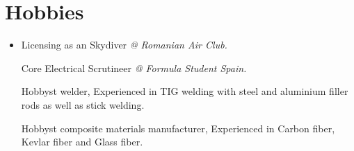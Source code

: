 \documentclass[letterpaper,11pt]{article}
\makeatletter
\newcommand{\resumeOrganizationHeading}[4]{
  \vspace{-2pt}\item
    \begin{tabular*}{0.97\textwidth}[t]{l@{\extracolsep{\fill}}r}
      \textbf{#1} & \textit{\small #2} \\
      \textit{\small#3}
    \end{tabular*}\vspace{-7pt}
}
\newcommand{\resumeSubHeadingListStart}{\begin{itemize}[leftmargin=0.15in, label={}]}
\newcommand{\resumeSubHeadingListEnd}{\end{itemize}}
\makeatother
\begin{document}

\section{Hobbies}
  \resumeSubHeadingListStart

    \item{
        Licensing as an Skydiver \textit{@ Romanian Air Club.}

      Core Electrical Scrutineer \textit{@ Formula Student Spain.}

      Hobbyst welder, Experienced in TIG welding with steel and aluminium filler rods as well as stick welding.

      Hobbyst composite materials manufacturer, Experienced in Carbon fiber, Kevlar fiber and Glass fiber.
    }

  \resumeSubHeadingListEnd




    
    
\end{document}
